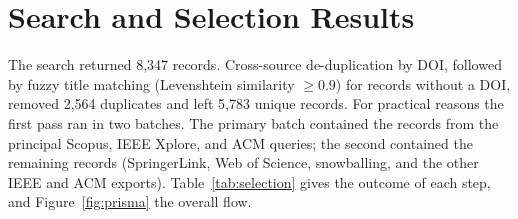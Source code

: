 \documentclass[preprint,12pt,authoryear=false]{elsarticle}
\begin{document}
\section{Search and Selection Results}\label{sec:selection}

The search returned 8,347 records. Cross-source de-duplication by DOI, followed by fuzzy title matching (Levenshtein similarity $\geq 0.9$) for records without a DOI, removed 2,564 duplicates and left 5,783 unique records. For practical reasons the first pass ran in two batches. The primary batch contained the records from the principal Scopus, IEEE Xplore, and ACM queries; the second contained the remaining records (SpringerLink, Web of Science, snowballing, and the other IEEE and ACM exports). Table~\ref{tab:selection} gives the outcome of each step, and Figure~\ref{fig:prisma} the overall flow.
\end{document}
